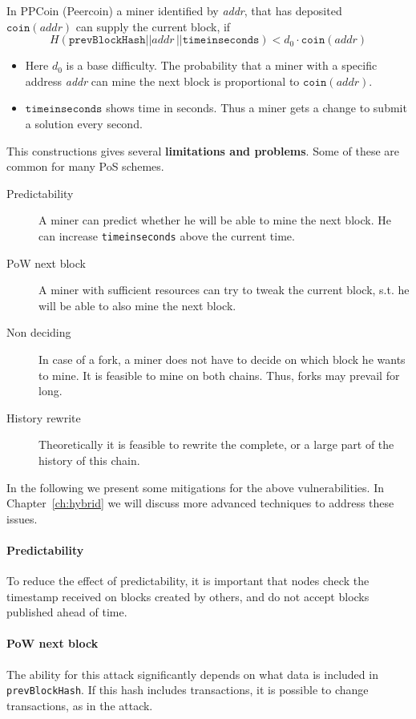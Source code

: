 \begin{example}
In PPCoin (Peercoin) a miner identified by \textit{addr}, that has deposited $\mathtt{coin}(\textit{addr})$ can supply the current block, if 
\[
	H(\mathtt{prevBlockHash} || \textit{addr}\, || \mathtt{time in seconds}) < d_0 \cdot \mathtt{coin}(\textit{addr})
\]
\begin{itemize}
	\item Here $d_0$ is a base difficulty. The probability that a miner with a specific address \textit{addr} can mine the next block is proportional to $\mathtt{coin}(\textit{addr})$.
	\item $\mathtt{timeinseconds}$ shows time in seconds. Thus a miner gets a change to submit a solution every second.
\end{itemize}

This constructions gives several \textbf{limitations and problems}. Some of these are common for many PoS schemes.
\begin{description}
	\item[Predictability] A miner can predict whether he will be able to mine the next block. He can increase \texttt{timeinseconds} above the current time.
	\item[PoW next block] A miner with sufficient resources can try to tweak the current block, s.t. he will be able to also mine the next block. 
	\item[Non deciding] In case of a fork, a miner does not have to decide on which block he wants to mine. It is feasible to mine on both chains. Thus, forks may prevail for long.
	\item[History rewrite] Theoretically it is feasible to rewrite the complete, or a large part of the history of this chain. 
\end{description}
\end{example}

In the following we present some mitigations for the above vulnerabilities. In Chapter~\ref{ch:hybrid} we will discuss more advanced techniques to address these issues.

\paragraph*{Predictability}
To reduce the effect of predictability, it is important that nodes check the timestamp received on blocks created by others, and do not accept blocks published ahead of time.

\paragraph*{PoW next block}
The ability for this attack significantly depends on what data is included in \texttt{prevBlockHash}.
If this hash includes transactions, it is possible to change transactions, as in the attack.


